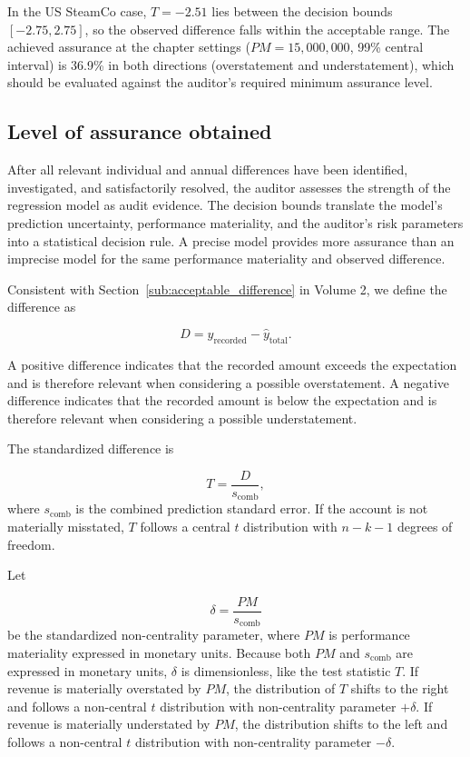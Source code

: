In the US SteamCo case, $T=-2.51$ lies between the decision bounds $[-2.75, 2.75]$, so the observed difference falls within the acceptable range. The achieved assurance at the chapter settings ($PM=15,000,000$, 99\% central interval) is 36.9\% in both directions (overstatement and understatement), which should be evaluated against the auditor's required minimum assurance level.


\subsection{Level of assurance obtained} %
\label{sub:level_of_assurance_obtained}

After all relevant individual and annual differences have been identified, investigated, and satisfactorily resolved, the auditor assesses the strength of the regression model as audit evidence. The decision bounds translate the model's prediction uncertainty, performance materiality, and the auditor's risk parameters into a statistical decision rule. A precise model provides more assurance than an imprecise model for the same performance materiality and observed difference.

Consistent with Section~\ref{sub:acceptable_difference} in Volume 2, we define the difference as

\begin{equation}
D = y_{\text{recorded}} - \hat{y}_{\text{total}}.
\end{equation}

A positive difference indicates that the recorded amount exceeds the expectation and is therefore relevant when considering a possible overstatement. A negative difference indicates that the recorded amount is below the expectation and is therefore relevant when considering a possible understatement.

The standardized difference is

\begin{equation}
T = \frac{D}{s_{\text{comb}}},
\end{equation}
where $s_{\text{comb}}$ is the combined prediction standard error. If the account is not materially misstated, $T$ follows a central $t$ distribution with $n - k - 1$ degrees of freedom.

Let

\begin{equation}
\delta = \frac{PM}{s_{\text{comb}}}
\end{equation}
be the standardized non-centrality parameter, where $PM$ is performance materiality expressed in monetary units. Because both $PM$ and $s_{\text{comb}}$ are expressed in monetary units, $\delta$ is dimensionless, like the test statistic $T$. If revenue is materially overstated by $PM$, the distribution of $T$ shifts to the right and follows a non-central $t$ distribution with non-centrality parameter $+\delta$. If revenue is materially understated by $PM$, the distribution shifts to the left and follows a non-central $t$ distribution with non-centrality parameter $-\delta$.

